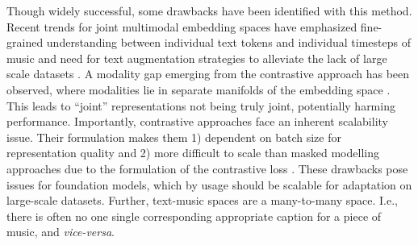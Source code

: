 \documentclass{article}
\begin{document}
Though widely successful, some drawbacks have been identified with this method. Recent trends for joint multimodal embedding spaces have emphasized fine-grained understanding between individual text tokens and individual timesteps of music \cite{wu2024collap, komatsu2025aligned} and need for text augmentation strategies to alleviate the lack of large scale datasets \cite{yuan2024t,manco2024augment}. A modality gap emerging from the contrastive approach has been observed, where modalities lie in separate manifolds of the embedding space \cite{Fahim2024, liang2022mind}. This leads to ``joint'' representations not being truly joint, potentially harming performance. Importantly, contrastive approaches face an inherent scalability issue. Their formulation makes them 1) dependent on batch size for representation quality and 2) more difficult to scale than masked modelling approaches due to the formulation of the contrastive loss \cite{pham2023combined}. These drawbacks pose issues for foundation models, which by usage should be scalable for adaptation on large-scale datasets. Further, text-music spaces are a many-to-many space. I.e., there is often no one single corresponding appropriate caption for a piece of music, and \textit{vice-versa}. 

\end{document}
